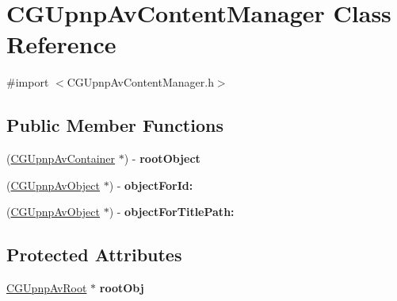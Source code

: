 \hypertarget{interface_c_g_upnp_av_content_manager}{\section{C\-G\-Upnp\-Av\-Content\-Manager Class Reference}
\label{interface_c_g_upnp_av_content_manager}
}


{\ttfamily \#import $<$C\-G\-Upnp\-Av\-Content\-Manager.\-h$>$}

\subsection*{Public Member Functions}
\begin{DoxyCompactItemize}
\item 
\hypertarget{interface_c_g_upnp_av_content_manager_a735e6c3d49c61e5959431ab79747bbe7}{(\hyperlink{interface_c_g_upnp_av_container}{C\-G\-Upnp\-Av\-Container} $\ast$) -\/ {\bfseries root\-Object}}\label{interface_c_g_upnp_av_content_manager_a735e6c3d49c61e5959431ab79747bbe7}

\item 
\hypertarget{interface_c_g_upnp_av_content_manager_ab046466ff25f237df51a8dac97937b74}{(\hyperlink{interface_c_g_upnp_av_object}{C\-G\-Upnp\-Av\-Object} $\ast$) -\/ {\bfseries object\-For\-Id\-:}}\label{interface_c_g_upnp_av_content_manager_ab046466ff25f237df51a8dac97937b74}

\item 
\hypertarget{interface_c_g_upnp_av_content_manager_a12573e90d5f19582484c022cac174fde}{(\hyperlink{interface_c_g_upnp_av_object}{C\-G\-Upnp\-Av\-Object} $\ast$) -\/ {\bfseries object\-For\-Title\-Path\-:}}\label{interface_c_g_upnp_av_content_manager_a12573e90d5f19582484c022cac174fde}

\end{DoxyCompactItemize}
\subsection*{Protected Attributes}
\begin{DoxyCompactItemize}
\item 
\hypertarget{interface_c_g_upnp_av_content_manager_a7cda72a06f4c6045e5cb2896f8c261bd}{\hyperlink{interface_c_g_upnp_av_root}{C\-G\-Upnp\-Av\-Root} $\ast$ {\bfseries root\-Obj}}\label{interface_c_g_upnp_av_content_manager_a7cda72a06f4c6045e5cb2896f8c261bd}

\end{DoxyCompactItemize}



